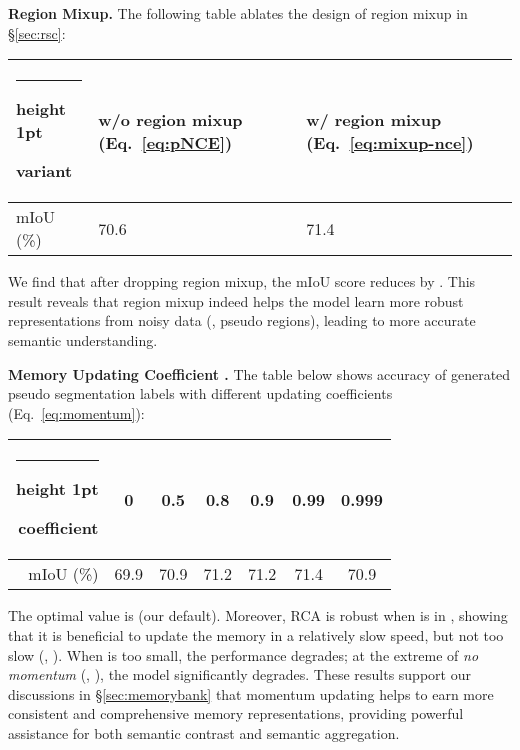 \documentclass[10pt,twocolumn,letterpaper]{article}
\makeatletter
\newcommand{\thickhline}{\noalign {\ifnum 0=`}\fi \hrule height 1pt
	\futurelet \reserved@a \@xhline
}
\newcommand{\tablestyle}[2]{\setlength{\tabcolsep}{#1}\renewcommand{\arraystretch}{#2}\centering\footnotesize}
\makeatother
\begin{document}
\noindent\textbf{Region Mixup.} The following table ablates the design of region mixup in \S\ref{sec:rsc}:
\vspace{-6pt}
\begin{table}[H]
	\small
	\centering	
		\tablestyle{1pt}{1.05}
		\begin{tabular}{|z{40}|x{90}x{90}|}
			\thickhline
variant 
			& {w/o} region mixup (Eq.~\ref{eq:pNCE}) & {w/} region mixup (Eq.~\ref{eq:mixup-nce})  \\ \hline		 
			mIoU (\%)           						 
			& 70.6 & 71.4  \\ \hline		 
	\end{tabular}
	\vspace{-10pt}
\end{table}
\noindent We find that after dropping region mixup, the mIoU score reduces by . This result reveals that region mixup  indeed helps the model learn more robust representations from noisy data (\ie, pseudo regions), leading to more accurate semantic understanding.

\noindent\textbf{Memory Updating Coefficient .} The table below shows accuracy of generated pseudo segmentation labels with different updating coefficients (Eq.~\ref{eq:momentum}):
\vspace{-6pt}
\begin{table}[H]
	\small
	\centering	
		\tablestyle{7pt}{1.05}
		\begin{tabular}{|r|cccccc|}
			\thickhline
coefficient                                    
			& 0  & 0.5 & 0.8 & 0.9 & 0.99 & 0.999\\ \hline		 
			mIoU (\%)           						 
			& 69.9 & 70.9 & 71.2 & 71.2 & 71.4 & 70.9 \\ \hline		 
	\end{tabular}
	\vspace{-10pt}
\end{table}
\noindent The optimal value is  (our default). Moreover, RCA is robust when  is in , showing that it is beneficial to update the memory in a relatively slow speed, but not too slow (\ie, ). When  is too small, the performance degrades; at the extreme of \emph{no momentum} (\ie, ), the model significantly  degrades. These results support our discussions in \S\ref{sec:memorybank} that momentum updating helps to earn more consistent and comprehensive memory representations, providing powerful assistance for both semantic contrast and semantic aggregation.
\end{document}
